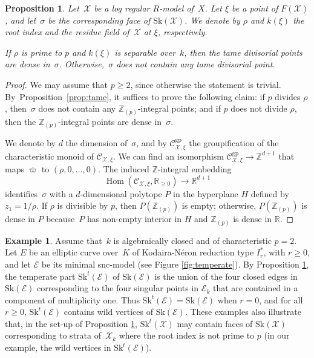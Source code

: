 \documentclass[JEP,XML,SOM,Unicode,NoFloatCountersInSection]{cedram}
\let\mathcal\mathscr
\newtheorem{prop}[equation]{Proposition}
\theoremstyle{definition}
\newtheorem{example}[equation]{Example}
\numberwithin{equation}{subsection}
\newcommand{\Z}{\ensuremath{\mathbb{Z}}}
\newcommand{\R}{\ensuremath{\mathbb{R}}}
\newcommand{\cX}{\ensuremath{\mathscr{X}}}
\newcommand{\cE}{\ensuremath{\mathscr{E}}}
\newcommand{\gp}{\mathrm{gp}}
\newcommand{\Sk}{\mathrm{Sk}}
\DeclareMathOperator{\Hom}{Hom}
\let\unif\varpi
\begin{document}
\begin{prop}\label{prop:tamecrit}
Let~$\cX$ be a log regular $R$\nobreakdash-model of~$X$. Let $\xi$ be a point of $F(\cX)$, and let~$\sigma$ be the corresponding face of
$\Sk(\cX)$. We denote by $\rho$ and $k(\xi)$ the root index and the residue field of~$\cX$ at $\xi$, respectively.

If $\rho$ is prime to $p$ and $k(\xi)$ is separable over~$k$, then the tame divisorial points are dense in~$\sigma$. Otherwise,~$\sigma$ does not contain any tame divisorial point.
\end{prop}
\begin{proof}
We may assume that $p\geq 2$, since otherwise the statement is trivial.
By~Pro\-position~\ref{prop:tame}, it suffices to prove the following claim: if $p$ divides $\rho$, then~$\sigma$ does not contain any $\Z_{(p)}$-integral points; and if $p$ does not divide $\rho$, then the $\Z_{(p)}$-integral points are dense in~$\sigma$.

We denote by $d$ the dimension of~$\sigma$, and by
$\mathcal{C}^{\gp}_{\cX,\xi}$ the groupification of the characteristic monoid of $\mathcal{C}_{\cX,\xi}$.
We can find an isomorphism $\mathcal{C}^{\gp}_{\cX,\xi}\to \Z^{d+1}$ that maps
$\overline{\unif}$ to $(\rho,0,\ldots,0)$. The induced $\Z$-integral embedding
\[
\Hom(\mathcal{C}_{\cX,\xi}, \R_{\geq 0}) \to \R^{d+1}
\]
identifies~$\sigma$
with a $d$-dimensional polytope $P$ in the hyperplane $H$ defined by $z_1=1/\rho$.
If $\rho$ is divisible by $p$, then $P(\Z_{(p)})$ is empty; otherwise, $P(\Z_{(p)})$ is dense in $P$
because~$P$ has non-empty interior in $H$ and $\Z_{(p)}$ is dense in $\R$.
\end{proof}

\begin{example}\label{exam:temperate}
Assume that~$k$ is algebraically closed and of characteristic $p=2$. Let $E$ be an elliptic curve over~$K$ of Kodaira-Néron reduction type $I^{\ast}_r$, with $r\geq 0$, and let $\mathscr{E}$ be its minimal snc-model (see Figure \ref{fig:temperate}). By Proposition \ref{prop:tamecrit}, the temperate part $\Sk^t(\mathscr{E})$ of $\Sk(\mathscr{E})$ is the union of the four closed edges in $\Sk(\mathscr{E})$ corresponding to the four singular points in $\mathscr{E}_{k}$ that are contained in a component of multiplicity one.
Thus $\Sk^t(\mathscr{E})=\Sk(\mathscr{E})$ when $r=0$, and for all $r\geq 0$,
$\Sk^t(\mathscr{E})$ contains wild vertices of $\Sk(\cE)$. These examples also illustrate that, in the set-up of Proposition \ref{prop:tamecrit},
$\Sk^t(\cX)$ may contain faces of $\Sk(\cX)$ corresponding to strata of~$\cX_k$ where the root index is not prime to $p$ (in our example, the wild vertices in $\Sk^t(\mathscr{E})$).
\end{example}
\end{document}
